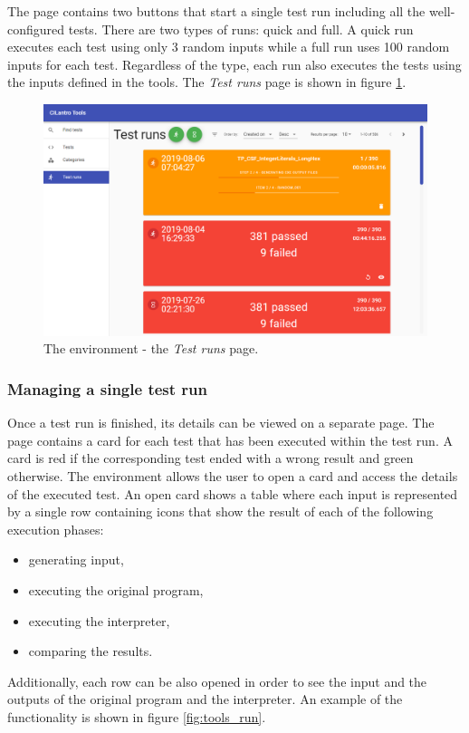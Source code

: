 \documentclass{article}
\numberwithin{equation}{section}
\begin{document}
The page contains two buttons that start a single test run including all the well-configured tests. There are two types of runs: quick and full. A quick run executes each test using only 3 random inputs while a full run uses 100 random inputs for each test. Regardless of the type, each run also executes the tests using the inputs defined in the tools. The \textit{Test runs} page is shown in figure \ref{fig:tools_runs}.

\begin{figure}
	\includegraphics[width=1\textwidth]{tools_runs.png}
    \centering
    \caption{The environment - the \textit{Test runs} page.}
    \label{fig:tools_runs}
\end{figure}

\subsubsection{Managing a single test run}

Once a test run is finished, its details can be viewed on a separate page. The page contains a card for each test that has been executed within the test run. A card is red if the corresponding test ended with a wrong result and green otherwise. The environment allows the user to open a card and access the details of the executed test. An open card shows a table where each input is represented by a single row containing icons that show the result of each of the following execution phases:
\begin{itemize}
	\item{generating input},
	\item{executing the original program},
	\item{executing the interpreter},
	\item{comparing the results}.
\end{itemize}
Additionally, each row can be also opened in order to see the input and the outputs of the original program and the interpreter. An example of the functionality is shown in figure \ref{fig:tools_run}.
\end{document}
